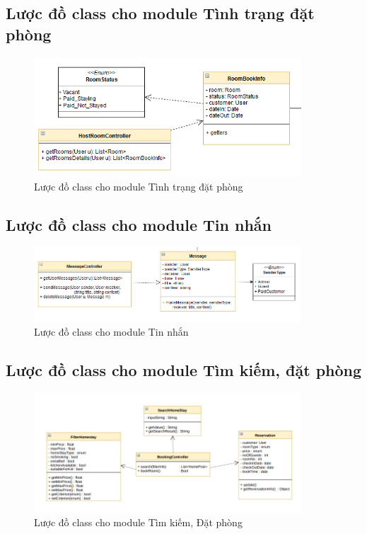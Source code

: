 \subsection{Lược đồ class cho module Tình trạng đặt phòng}
\begin{figure}[H]
	\centering
	\includegraphics[width=10cm]{parts/Cuong/images/host-room.png}
	\vspace{0.5cm}
	\caption{Lược đồ class cho module Tình trạng đặt phòng}
\end{figure}

\subsection{Lược đồ class cho module Tin nhắn}
\begin{figure}[H]
	\centering
	\includegraphics[width=10cm]{parts/Cuong/images/message.png}
	\vspace{0.5cm}
	\caption{Lược đồ class cho module Tin nhắn}
\end{figure}

\subsection{Lược đồ class cho module Tìm kiếm, đặt phòng}
\begin{figure}[H]
	\centering
	\includegraphics[width=10cm]{Image/999.png}
	\vspace{0.5cm}
	\caption{Lược đồ class cho module Tìm kiếm, Đặt phòng}
\end{figure}